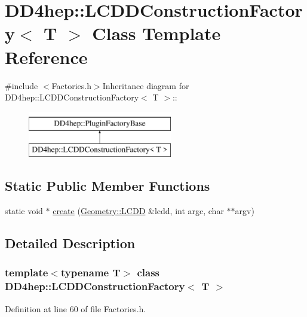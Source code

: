 \hypertarget{class_d_d4hep_1_1_l_c_d_d_construction_factory}{
\section{DD4hep::LCDDConstructionFactory$<$ T $>$ Class Template Reference}
\label{class_d_d4hep_1_1_l_c_d_d_construction_factory}
}


{\ttfamily \#include $<$Factories.h$>$}Inheritance diagram for DD4hep::LCDDConstructionFactory$<$ T $>$::\begin{figure}[H]
\begin{center}
\leavevmode
\includegraphics[height=2cm]{class_d_d4hep_1_1_l_c_d_d_construction_factory}
\end{center}
\end{figure}
\subsection*{Static Public Member Functions}
\begin{DoxyCompactItemize}
\item 
static void $\ast$ \hyperlink{class_d_d4hep_1_1_l_c_d_d_construction_factory_aa6fda027eb3dbfc490d9daad93ea18a0}{create} (\hyperlink{class_d_d4hep_1_1_geometry_1_1_l_c_d_d}{Geometry::LCDD} \&lcdd, int argc, char $\ast$$\ast$argv)
\end{DoxyCompactItemize}


\subsection{Detailed Description}
\subsubsection*{template$<$typename T$>$ class DD4hep::LCDDConstructionFactory$<$ T $>$}



Definition at line 60 of file Factories.h.

